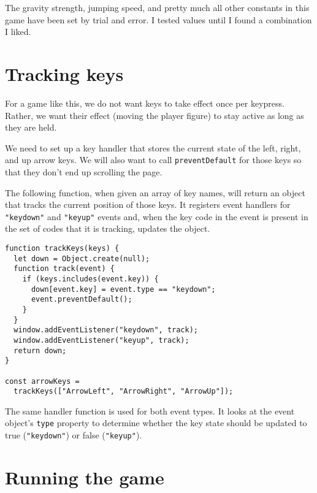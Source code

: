 The gravity strength, jumping speed, and pretty much all other constants in this game have been set by trial and error. I tested values until I found a combination I liked.

\section{Tracking keys}

For a game like this, we do not want keys to take effect once per keypress. Rather, we want their effect (moving the player figure) to stay active as long as they are held.

We need to set up a key handler that stores the current state of the left, right, and up arrow keys. We will also want to call \lstinline`preventDefault` for those keys so that they don't end up scrolling the page.

The following function, when given an array of key names, will return an object that tracks the current position of those keys. It registers event handlers for \lstinline`"keydown"` and \lstinline`"keyup"` events and, when the key code in the event is present in the set of codes that it is tracking, updates the object.

\begin{lstlisting}
function trackKeys(keys) {
  let down = Object.create(null);
  function track(event) {
    if (keys.includes(event.key)) {
      down[event.key] = event.type == "keydown";
      event.preventDefault();
    }
  }
  window.addEventListener("keydown", track);
  window.addEventListener("keyup", track);
  return down;
}

const arrowKeys =
  trackKeys(["ArrowLeft", "ArrowRight", "ArrowUp"]);
\end{lstlisting}
\noindent{}

The same handler function is used for both event types. It looks at the event object's \lstinline`type` property to determine whether the key state should be updated to true (\lstinline`"keydown"`) or false (\lstinline`"keyup"`).

\label{game.runAnimation}\section{Running the game}

